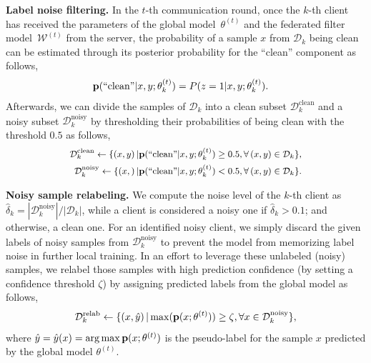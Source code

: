 \documentclass[letterpaper]{article} %
\DeclareMathOperator*{\argmax}{arg\,max}
\begin{document}
\noindent
\textbf{Label noise filtering.}
In the $t$-th communication round, once the $k$-th client has received the parameters of the global model~$\theta^{(t)}$ and the federated filter model~$\mathcal{W}^{(t)}$ from the server, the probability of a sample $x$ from $\mathcal{D}_k$ being clean can be estimated through its posterior probability for the ``clean'' component as follows,
\begin{equation}
    \begin{split}
        \textbf{\text{p}}(&\text{``clean''}|x,y;{\theta}_{k}^{(t)})=P(z=1|x,y;{\theta}_{k}^{(t)}).
    \end{split}
\end{equation}
Afterwards, we can divide the samples of $\mathcal{D}_{k}$ into a clean subset $\mathcal{D}_{k}^{\text{clean}}$ and a noisy subset $\mathcal{D}_{k}^{\text{noisy}}$ by thresholding their probabilities of being clean with the threshold $0.5$ as follows,
\noindent
\begin{equation}
    \label{Equation:Label-Splitting}
    \fontsize{8.90pt}{12pt}\selectfont
    \begin{split}
        \mathcal{D}_{k}^{\text{clean}} \leftarrow \{\left(x, y\right) | \textbf{\text{p}}(&\text{``clean''}|x,y;{\theta}_{k}^{(t)})\ge0.5, \forall \left(x, y\right)\in\mathcal{D}_{k}\}, \\
        \mathcal{D}_{k}^{\text{noisy}} \leftarrow \{\left(x, \right) | \textbf{\text{p}}(&\text{``clean''}|x,y;{\theta}_{k}^{(t)})<0.5, \forall \left(x, y\right)\in\mathcal{D}_{k}\}.
    \end{split}
\end{equation}


\noindent
\textbf{Noisy sample relabeling.}
We compute the noise level of the $k$-th client as $\hat{\delta}_{k} = |\mathcal{D}_{k}^{\text{noisy}}|/|\mathcal{D}_{k}|$, while a client is considered a noisy one if $\hat{\delta}_{k} > 0.1$; and otherwise, a clean one.
For an identified noisy client, we simply discard the given labels of noisy samples from $\mathcal{D}_{k}^{\text{noisy}}$ to prevent the model from memorizing label noise in further local training. In an effort to leverage these unlabeled (noisy) samples, we relabel those samples with high prediction confidence (by setting a confidence threshold $\zeta$) by assigning predicted labels from the global model as follows,
\begin{equation}
    \label{Equation:Relabel}
    \mathcal{D}_{k}^{\text{relab}} \leftarrow \{\left(x, \hat{y}\right) | \max(\textbf{\text{p}}(x;{\theta}^{(t)})) \ge \zeta, \forall x\in \mathcal{D}_{k}^{\text{noisy}}\},
\end{equation}
where $\hat{y}= \hat{y}(x)= \argmax \textbf{\text{p}}(x;{\theta}^{(t)})$ is the pseudo-label for the sample $x$ predicted by the global model ${\theta}^{(t)}$.
\end{document}
